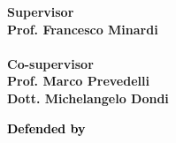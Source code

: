 \begin{titlepage}
    \begin{minipage}[t]{0.47\textwidth}
        {\large{\bf Supervisor \vspace{2mm}\\
        Prof. Francesco Minardi\\\\
        \bf Co-supervisor
        \vspace{2mm}\\
        {Prof. Marco Prevedelli} \\[1mm]
        {Dott. Michelangelo Dondi} \\}}
    \end{minipage}
    \hfill
    \begin{minipage}[L]{0.35\textwidth} \textcolor{black}{
        {
        \large{\bf  Defended by
        \vspace{2mm}\\
        }}
        }
    \end{minipage}

\end{titlepage}
\restoregeometry